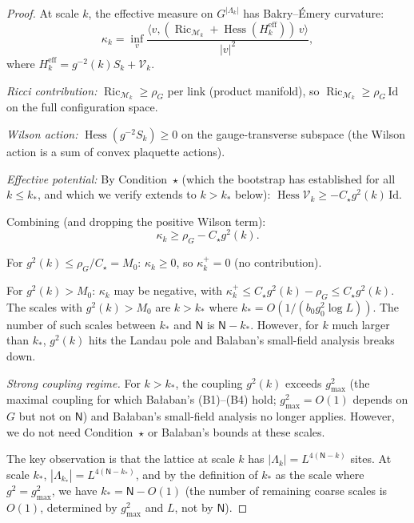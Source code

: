 \documentclass[11pt,a4paper]{article}
\theoremstyle{plain}
\theoremstyle{definition}
\theoremstyle{remark}
\newcommand{\Hess}{\operatorname{Hess}}
\newcommand{\Ric}{\operatorname{Ric}}
\newcommand{\cM}{\mathcal{M}}
\newcommand{\cV}{\mathcal{V}}
\begin{document}
\begin{proof}
At scale $k$, the effective measure on $G^{|\Lambda_k|}$
has Bakry--\'Emery curvature:
\begin{equation}
  \kappa_k = \inf_v \frac{\langle v,
  (\Ric_{\cM_k} + \Hess(H_k^{\mathrm{eff}}))\,v\rangle}
  {|v|^2},
\end{equation}
where $H_k^{\mathrm{eff}} = g^{-2}(k)S_k + \cV_k$.

\emph{Ricci contribution:} $\Ric_{\cM_k} \ge \rho_G$ per
link (product manifold), so $\Ric_{\cM_k} \ge \rho_G\,
\mathrm{Id}$ on the full configuration space.

\emph{Wilson action:} $\Hess(g^{-2}S_k) \ge 0$ on the
gauge-transverse subspace (the Wilson action is a sum of
convex plaquette actions).

\emph{Effective potential:} By Condition~$\star$ (which
the bootstrap has established for all $k \le k_*$,
and which we verify extends to $k > k_*$ below):
$\Hess\cV_k \ge -C_\star g^2(k)\,\mathrm{Id}$.

Combining (and dropping the positive Wilson term):
\begin{equation}
  \kappa_k \ge \rho_G - C_\star g^2(k).
\end{equation}

For $g^2(k) \le \rho_G/C_\star = M_0$: $\kappa_k \ge 0$,
so $\kappa_k^+ = 0$ (no contribution).

For $g^2(k) > M_0$: $\kappa_k$ may be negative, with
$\kappa_k^+ \le C_\star g^2(k) - \rho_G
\le C_\star g^2(k)$. The scales with $g^2(k) > M_0$
are $k > k_*$ where $k_* = O(1/(b_0 g_0^2\log L))$.
The number of such scales between $k_*$ and $\mathsf{N}$ is
$\mathsf{N} - k_*$. However, for $k$ much larger than $k_*$,
$g^2(k)$ hits the Landau pole and Balaban's small-field
analysis breaks down.

\emph{Strong coupling regime.} For $k > k_*$, the coupling
$g^2(k)$ exceeds $g_{\max}^2$ (the maximal coupling for which
Ba{\l}aban's (B1)--(B4) hold; $g_{\max}^2 = O(1)$
depends on $G$ but not on $\mathsf{N}$) and Ba{\l}aban's small-field
analysis no longer applies. However, we do not need
Condition~$\star$ or Balaban's bounds at these scales.

The key observation is that the lattice at scale $k$ has
$|\Lambda_k| = L^{4(\mathsf{N}-k)}$ sites. At scale $k_*$,
$|\Lambda_{k_*}| = L^{4(\mathsf{N}-k_*)}$, and by the definition
of $k_*$ as the scale where $g^2 = g_{\max}^2$, we have
$k_* = \mathsf{N} - O(1)$ (the number of remaining coarse
scales is $O(1)$, determined by $g_{\max}^2$ and $L$,
not by $\mathsf{N}$).


\end{proof}
\end{document}
